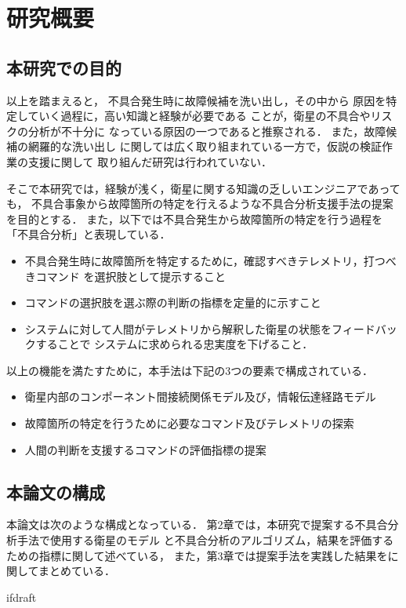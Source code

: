 \documentclass[11pt]{jsreport}
\begin{document}
\section{研究概要}
\subsection{本研究での目的}
以上を踏まえると，
不具合発生時に故障候補を洗い出し，その中から
原因を特定していく過程に，高い知識と経験が必要である
ことが，衛星の不具合やリスクの分析が不十分に
なっている原因の一つであると推察される．
また，故障候補の網羅的な洗い出し
に関しては広く取り組まれている一方で，仮説の検証作業の支援に関して
取り組んだ研究は行われていない．

そこで本研究では，経験が浅く，衛星に関する知識の乏しいエンジニアであっても，
不具合事象から故障箇所の特定を行えるような不具合分析支援手法の提案を目的とする．
また，以下では不具合発生から故障箇所の特定を行う過程を「不具合分析」と表現している．\\

\begin{itemize}
  \item 不具合発生時に故障箇所を特定するために，確認すべきテレメトリ，打つべきコマンド
  を選択肢として提示すること
  \item コマンドの選択肢を選ぶ際の判断の指標を定量的に示すこと
  \item システムに対して人間がテレメトリから解釈した衛星の状態をフィードバックすることで
  システムに求められる忠実度を下げること．%
\end{itemize}



以上の機能を満たすために，本手法は下記の3つの要素で構成されている．
\begin{itemize}
   \item 衛星内部のコンポーネント間接続関係モデル及び，情報伝達経路モデル
   \item 故障箇所の特定を行うために必要なコマンド及びテレメトリの探索 %
   \item 人間の判断を支援するコマンドの評価指標の提案
\end{itemize}

\subsection{本論文の構成}
本論文は次のような構成となっている．
第2章では，本研究で提案する不具合分析手法で使用する衛星のモデル
と不具合分析のアルゴリズム，結果を評価するための指標に関して述べている，
また，第3章では提案手法を実践した結果をに関してまとめている．

\expandafter\ifx\csname ifdraft\endcsname\relax
\end{document}
